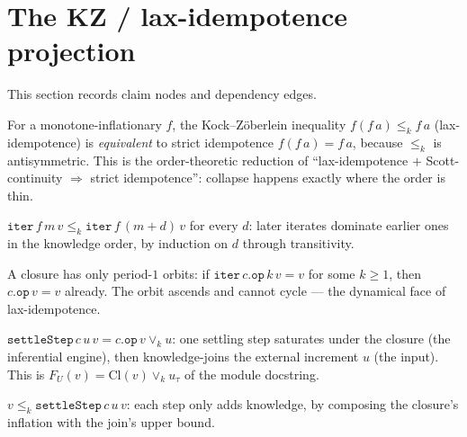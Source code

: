 \section{The KZ / lax-idempotence projection}

This section records claim nodes and dependency edges.

\begin{theorem}\label{thm:kz-iff-strict}\leanok{}
For a monotone-inflationary $f$, the Kock--Z\"oberlein inequality
$f(f\,a) \le_k f\,a$ (lax-idempotence) is \emph{equivalent} to strict
idempotence $f(f\,a) = f\,a$, because $\le_k$ is antisymmetric. This is the
order-theoretic reduction of ``lax-idempotence $+$ Scott-continuity $\Rightarrow$
strict idempotence'': collapse happens exactly where the order is thin.
\end{theorem}
\begin{theorem}\label{thm:iter-le-add}\leanok{}
$\texttt{iter}\,f\,m\,v \le_k \texttt{iter}\,f\,(m+d)\,v$ for every $d$: later
iterates dominate earlier ones in the knowledge order, by induction on $d$
through transitivity.
\end{theorem}
\begin{theorem}\label{thm:no-periodic-orbits}\leanok{}
A closure has only period-$1$ orbits: if $\texttt{iter}\,c.\texttt{op}\,k\,v = v$
for some $k \ge 1$, then $c.\texttt{op}\,v = v$ already. The orbit ascends and
cannot cycle --- the dynamical face of lax-idempotence.
\end{theorem}
\begin{proposition}[The settling-endofunctor $F_U = \mathrm{Cl} \vee_k u$]\label{thm:settle-step}\leanok{}
$\texttt{settleStep}\,c\,u\,v = c.\texttt{op}\,v \vee_k u$: one settling step
saturates under the closure (the inferential engine), then knowledge-joins the
external increment $u$ (the input). This is $F_U(v) = \mathrm{Cl}(v) \vee_k
u_\tau$ of the module docstring.
\end{proposition}
\begin{theorem}\label{thm:settle-step-infl}\leanok{}
$v \le_k \texttt{settleStep}\,c\,u\,v$: each step only adds knowledge, by
composing the closure's inflation with the join's upper bound.
\end{theorem}
